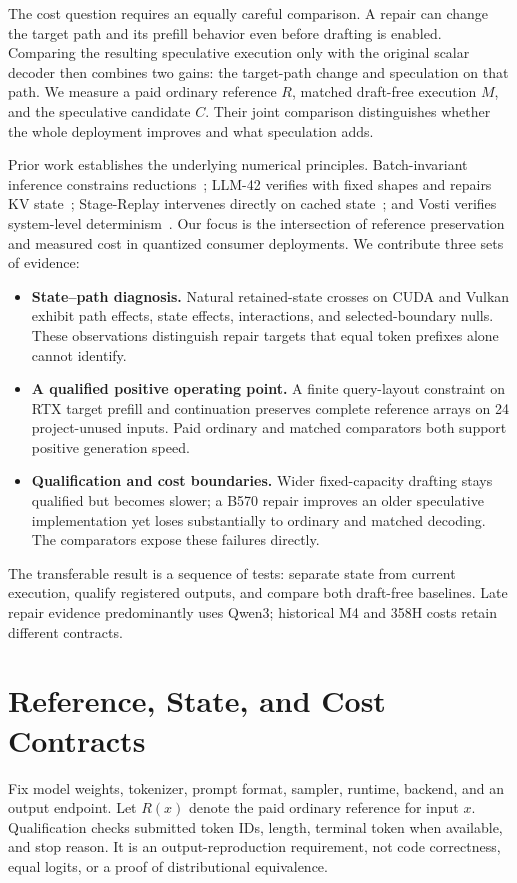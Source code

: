 \documentclass{article}
\begin{document}
The cost question requires an equally careful comparison. A repair can change the target path and its prefill behavior even before drafting is enabled. Comparing the resulting speculative execution only with the original scalar decoder then combines two gains: the target-path change and speculation on that path. We measure a paid ordinary reference $R$, matched draft-free execution $M$, and the speculative candidate $C$. Their joint comparison distinguishes whether the whole deployment improves and what speculation adds.

Prior work establishes the underlying numerical principles. Batch-invariant inference constrains reductions~\cite{thinkingmachines}; LLM-42 verifies with fixed shapes and repairs KV state~\cite{llm42}; Stage-Replay intervenes directly on cached state~\cite{stagereplay}; and Vosti verifies system-level determinism~\cite{vosti}. Our focus is the intersection of reference preservation and measured cost in quantized consumer deployments. We contribute three sets of evidence:
\begin{itemize}
\item \textbf{State--path diagnosis.} Natural retained-state crosses on CUDA and Vulkan exhibit path effects, state effects, interactions, and selected-boundary nulls. These observations distinguish repair targets that equal token prefixes alone cannot identify.
\item \textbf{A qualified positive operating point.} A finite query-layout constraint on RTX target prefill and continuation preserves complete reference arrays on 24 project-unused inputs. Paid ordinary and matched comparators both support positive generation speed.
\item \textbf{Qualification and cost boundaries.} Wider fixed-capacity drafting stays qualified but becomes slower; a B570 repair improves an older speculative implementation yet loses substantially to ordinary and matched decoding. The comparators expose these failures directly.
\end{itemize}

The transferable result is a sequence of tests: separate state from current execution, qualify registered outputs, and compare both draft-free baselines. Late repair evidence predominantly uses Qwen3; historical M4 and 358H costs retain different contracts.

\section{Reference, State, and Cost Contracts}
\label{sec:contracts}
Fix model weights, tokenizer, prompt format, sampler, runtime, backend, and an output endpoint. Let $R(x)$ denote the paid ordinary reference for input $x$. Qualification checks submitted token IDs, length, terminal token when available, and stop reason. It is an output-reproduction requirement, not code correctness, equal logits, or a proof of distributional equivalence.
\end{document}
